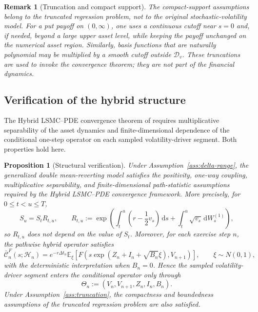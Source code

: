 \documentclass[pdflatex,sn-mathphys-num]{sn-jnl}
\theoremstyle{thmstyleone}%
\newtheorem{proposition}[theorem]{Proposition}
\theoremstyle{thmstylethree}%
\theoremstyle{thmstyletwo}%
\newtheorem{remark}[theorem]{Remark}
\newcommand{\dd}{\mathrm d}
\newcommand{\E}{\mathbb E}
\begin{document}
\begin{remark}[Truncation and compact support]\label{rem:truncation-compact-support}
The compact-support assumptions belong to the truncated regression problem, not
to the original stochastic-volatility model. For a put payoff on $(0,\infty)$,
one uses a continuous cutoff near $s=0$ and, if needed, beyond a large upper
asset level, while keeping the payoff unchanged on the numerical asset region.
Similarly, basis functions that are naturally polynomial may be multiplied by a
smooth cutoff outside $\mathcal D_v$. These truncations are used to invoke the
convergence theorem; they are not part of the financial dynamics.
\end{remark}

\subsection{Verification of the hybrid structure}
\label{subsec:separability}

The Hybrid LSMC--PDE convergence theorem of \cite{farahany2020mixing} requires
multiplicative separability of the asset dynamics and finite-dimensional
dependence of the conditional one-step operator on each sampled volatility-driver
segment. Both properties hold here.

\begin{proposition}[Structural verification]
\label{prop:hybrid-assumptions}
Under Assumption~\ref{ass:delta-range}, the generalized double mean-reverting
model satisfies the positivity, one-way coupling, multiplicative separability,
and finite-dimensional path-statistic assumptions required by the Hybrid
LSMC--PDE convergence framework. More precisely, for $0\le t<u\le T$,
\[
S_u=S_tR_{t,u},
\qquad
R_{t,u}:=
\exp\left(
\int_t^u\left(r-\frac12v_s\right)\,\dd s
+
\int_t^u\sqrt{v_s}\,\dd W_s^{(1)}
\right),
\]
so $R_{t,u}$ does not depend on the value of $S_t$. Moreover, for each exercise
step $n$, the pathwise hybrid operator satisfies
\[
\bar{\mathcal C}_n^F(s;\mathcal H_n)
=
e^{-r\Delta t_n}
\E_\xi\!\left[
F\left(
s\exp(Z_n+I_n+\sqrt{B_n}\xi),
V_{n+1}
\right)
\right],
\qquad \xi\sim N(0,1),
\]
with the deterministic interpretation when $B_n=0$. Hence the sampled
volatility-driver segment enters the conditional operator only through
\[
\Theta_n:=(V_n,V_{n+1},Z_n,I_n,B_n).
\]
Under Assumption~\ref{ass:truncation}, the compactness and boundedness
assumptions of the truncated regression problem are also satisfied.
\end{proposition}
\end{document}
